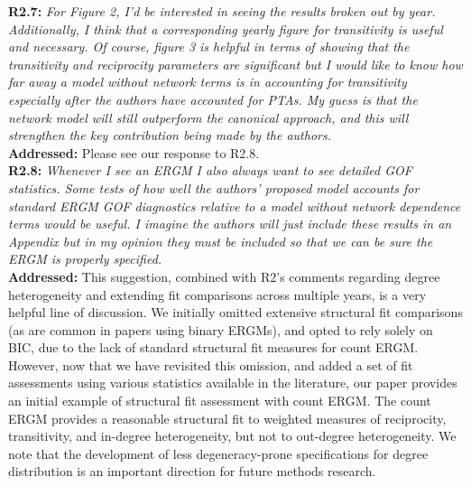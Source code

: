 \documentclass[a4paper,11pt]{texMemo}
\begin{document}
\noindent \textbf{R2.7:} \emph{For Figure 2, I'd be interested in seeing the results broken out by year. Additionally, I think that a corresponding yearly figure for transitivity is useful and necessary. Of course, figure 3 is helpful in terms of showing that the transitivity and reciprocity parameters are significant but I would like to know how far away a model without network terms is in accounting for transitivity especially after the authors have accounted for PTAs. My guess is that the network model will still outperform the canonical approach, and this will strengthen the key contribution being made by the authors.}\\

\noindent \textbf{Addressed:} Please see our response to R2.8.  \\

\noindent \textbf{R2.8:} \emph{Whenever I see an ERGM I also always want to see detailed GOF statistics. Some tests of how well the authors' proposed model accounts for standard ERGM GOF diagnostics relative to a model without network dependence terms would be useful. I imagine the authors will just include these results in an Appendix but in my opinion they must be included so that we can be sure the ERGM is properly specified.}\\

\noindent \textbf{Addressed:}  This suggestion, combined with R2's comments regarding degree heterogeneity and extending fit comparisons across multiple years, is a very helpful line of discussion. We initially omitted extensive structural fit comparisons (as are common in papers using binary ERGMs), and opted to rely solely on BIC, due to the lack of standard structural fit measures for count ERGM. However, now that we have revisited this omission, and added a set of fit assessments using various statistics available in the literature, our paper provides an initial example of structural fit assessment with count ERGM.  The count ERGM provides a reasonable structural fit to weighted measures of reciprocity, transitivity, and in-degree heterogeneity, but not to out-degree heterogeneity. We note that the development of less degeneracy-prone specifications for degree distribution is an important direction for future methods research. \\
\\
\end{document}
